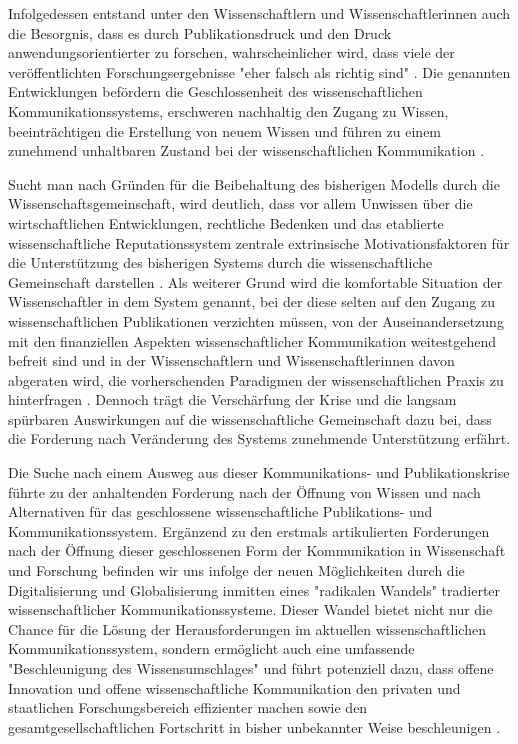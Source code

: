 Infolgedessen entstand unter den Wissenschaftlern und Wissenschaftlerinnen auch die Besorgnis, dass es durch Publikationsdruck und den Druck anwendungsorientierter zu forschen, wahrscheinlicher wird, dass viele der veröffentlichten Forschungsergebnisse "eher falsch als richtig sind" \cite{Ioannidis_2005}. Die genannten Entwicklungen befördern die Geschlossenheit des wissenschaftlichen Kommunikationssystems, erschweren nachhaltig den Zugang zu Wissen, beeinträchtigen die Erstellung von neuem Wissen \cite{Willinsky_2006} \cite{Feyerabend_1986} \cite{Luhmann_1998} und führen zu einem zunehmend unhaltbaren Zustand bei der wissenschaftlichen Kommunikation \cite{Schekman_2013}.

Sucht man nach Gründen für die Beibehaltung des bisherigen Modells durch die Wissenschaftsgemeinschaft, wird deutlich, dass vor allem Unwissen über die wirtschaftlichen Entwicklungen, rechtliche Bedenken und das etablierte wissenschaftliche Reputationssystem zentrale extrinsische Motivationsfaktoren für die Unterstützung des bisherigen Systems durch die wissenschaftliche Gemeinschaft darstellen \cite{Herb_2015}. Als weiterer Grund wird die komfortable Situation der Wissenschaftler in dem System genannt, bei der diese selten auf den Zugang zu wissenschaftlichen Publikationen verzichten müssen, von der Auseinandersetzung mit den finanziellen Aspekten wissenschaftlicher Kommunikation weitestgehend befreit sind \cite{Sietmann_2007} \cite{Hanekop_2006} und in der Wissenschaftlern und Wissenschaftlerinnen davon abgeraten wird, die vorherschenden Paradigmen der wissenschaftlichen Praxis zu hinterfragen \cite{Siegfried_2013} \cite{Loeb_2013}. Dennoch trägt die Verschärfung der Krise und die langsam spürbaren Auswirkungen auf die wissenschaftliche Gemeinschaft dazu bei, dass die Forderung nach Veränderung des Systems zunehmende Unterstützung erfährt.

Die Suche nach einem Ausweg aus dieser Kommunikations- und Publikationskrise führte zu der anhaltenden Forderung nach der Öffnung von Wissen und nach Alternativen für das geschlossene wissenschaftliche Publikations- und Kommunikationssystem. Ergänzend zu den erstmals artikulierten Forderungen nach der Öffnung dieser geschlossenen Form der Kommunikation in Wissenschaft und Forschung befinden wir uns infolge der neuen Möglichkeiten durch die Digitalisierung und Globalisierung \cite{McLuhan_1962} inmitten eines "radikalen Wandels" \cite{Poynder_2011} tradierter wissenschaftlicher Kommunikationssysteme. Dieser Wandel bietet nicht nur die Chance für die Lösung der Herausforderungen im aktuellen wissenschaftlichen Kommunikationssystem, sondern ermöglicht auch eine umfassende "Beschleunigung des Wissensumschlages" \cite{Wenzel_2003} und führt potenziell dazu, dass offene Innovation und offene wissenschaftliche Kommunikation den privaten und staatlichen Forschungsbereich effizienter machen \cite{Chesbrough_2006} sowie den gesamtgesellschaftlichen Fortschritt in bisher unbekannter Weise beschleunigen \cite{Chesbrough_2003}.

